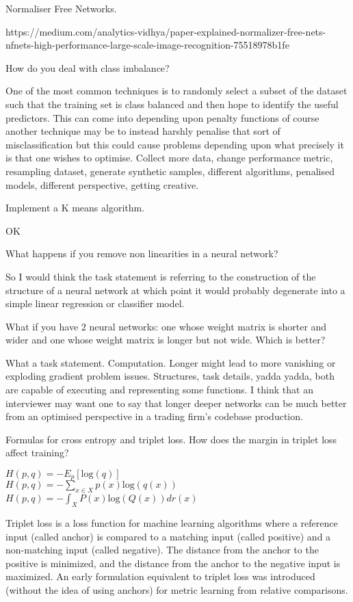 Normaliser Free Networks.

https://medium.com/analytics-vidhya/paper-explained-normalizer-free-nets-nfnets-high-performance-large-scale-image-recognition-75518978b1fe

How do you deal with class imbalance?

One of the most common techniques is to randomly select a subset of the dataset such that the training set is class balanced and then hope to identify the useful predictors. This can come into depending upon penalty functions of course another technique may be to instead harshly penalise that sort of misclassification but this could cause problems depending upon what precisely it is that one wishes to optimise. Collect more data, change performance metric, resampling dataset, generate synthetic samples, different algorithms, penalised models, different perspective, getting creative.

Implement a K means algorithm.

OK

What happens if you remove non linearities in a neural network?

So I would think the task statement is referring to the construction of the structure of a neural network at which point it would probably degenerate into a simple linear regression or classifier model.

What if you have $2$ neural networks: one whose weight matrix is shorter and wider and one whose weight matrix is longer but not wide. Which is better?

What a task statement. Computation. Longer might lead to more vanishing or exploding gradient problem issues. Structures, task details, yadda yadda, both are capable of executing and representing some functions. I think that an interviewer may want one to say that longer deeper networks can be much better from an optimised perspective in a trading firm's codebase production.

Formulas for cross entropy and triplet loss. How does the margin in triplet loss affect training?

$H(p,q) = -E_p [\text{log}(q)]$ \\
$H(p,q) = - \sum_{x \in X} p(x) \text{log} (q(x))$ \\
$H(p,q) = - \int_X P(x) \text{log}(Q(x)) dr(x)$

Triplet loss is a loss function for machine learning algorithms where a reference input (called anchor) is compared to a matching input (called positive) and a non-matching input (called negative). The distance from the anchor to the positive is minimized, and the distance from the anchor to the negative input is maximized. An early formulation equivalent to triplet loss was introduced (without the idea of using anchors) for metric learning from relative comparisons.

